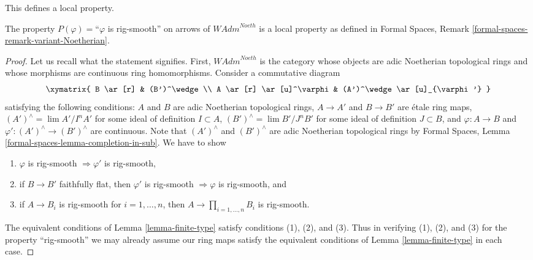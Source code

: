 \noindent
This defines a local property.

\begin{lemma}
\label{lemma-rig-smooth-axioms}
The property $P(\varphi)=$``$\varphi$ is rig-smooth'' on arrows
of $\textit{WAdm}^{Noeth}$ is a local property as defined in
Formal Spaces, Remark \ref{formal-spaces-remark-variant-Noetherian}.
\end{lemma}

\begin{proof}
Let us recall what the statement signifies. First, 
$\textit{WAdm}^{Noeth}$ is the category whose objects are
adic Noetherian topological rings and whose morphisms are
continuous ring homomorphisms. Consider a commutative diagram
$$
\xymatrix{
B \ar[r] & (B')^\wedge \\
A \ar[r] \ar[u]^\varphi & (A')^\wedge \ar[u]_{\varphi'}
}
$$
satisfying the following conditions:
$A$ and $B$ are adic Noetherian topological rings,
$A \to A'$ and $B \to B'$ are \'etale ring maps,
$(A')^\wedge = \lim A'/I^nA'$ for some ideal of definition $I \subset A$,
$(B')^\wedge = \lim B'/J^nB'$ for some ideal of definition $J \subset B$, and
$\varphi : A \to B$ and $\varphi' : (A')^\wedge \to (B')^\wedge$
are continuous. Note that $(A')^\wedge$ and $(B')^\wedge$ are
adic Noetherian topological rings by
Formal Spaces, Lemma \ref{formal-spaces-lemma-completion-in-sub}.
We have to show
\begin{enumerate}
\item $\varphi$ is rig-smooth $\Rightarrow \varphi'$ is rig-smooth,
\item if $B \to B'$ faithfully flat, then $\varphi'$ is rig-smooth
$\Rightarrow \varphi$ is rig-smooth, and
\item if $A \to B_i$ is rig-smooth for $i = 1, \ldots, n$, then
$A \to \prod_{i = 1, \ldots, n} B_i$ is rig-smooth.
\end{enumerate}
The equivalent conditions of Lemma \ref{lemma-finite-type} satisfy
conditions (1), (2), and (3).
Thus in verifying (1), (2), and (3) for the property
``rig-smooth'' we may already assume our ring maps satisfy
the equivalent conditions of Lemma \ref{lemma-finite-type}
in each case.


\end{proof}
